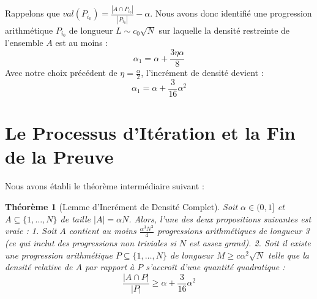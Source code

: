 \documentclass[12pt, a4paper]{article}
\newtheorem{theorem}{Théorème}[section]
\begin{document}
Rappelons que $val(P_{i_0}) = \frac{|A \cap P_{i_0}|}{|P_{i_0}|} - \alpha$.
Nous avons donc identifié une progression arithmétique $P_{i_0}$ de longueur $L \sim c_0 \sqrt{N}$ sur laquelle la densité restreinte de l'ensemble $A$ est au moins :
\begin{equation}
\alpha_1 = \alpha + \frac{3\eta \alpha}{8}
\end{equation}
Avec notre choix précédent de $\eta = \frac{\alpha}{2}$, l'incrément de densité devient :
\begin{equation}
\alpha_1 = \alpha + \frac{3}{16} \alpha^2
\end{equation}

\section{Le Processus d'Itération et la Fin de la Preuve}

Nous avons établi le théorème intermédiaire suivant :

\begin{theorem}[Lemme d'Incrément de Densité Complet]
Soit $\alpha \in (0,1]$ et $A \subseteq \{1, \dots, N\}$ de taille $|A| = \alpha N$.
Alors, l'une des deux propositions suivantes est vraie :
1. Soit $A$ contient au moins $\frac{\alpha^3 N^2}{4}$ progressions arithmétiques de longueur 3 (ce qui inclut des progressions non triviales si $N$ est assez grand).
2. Soit il existe une progression arithmétique $P \subseteq \{1, \dots, N\}$ de longueur $M \geq c \alpha^2 \sqrt{N}$ telle que la densité relative de $A$ par rapport à $P$ s'accroît d'une quantité quadratique :
\begin{equation}
\frac{|A \cap P|}{|P|} \geq \alpha + \frac{3}{16} \alpha^2
\end{equation}
\end{theorem}
\end{document}
